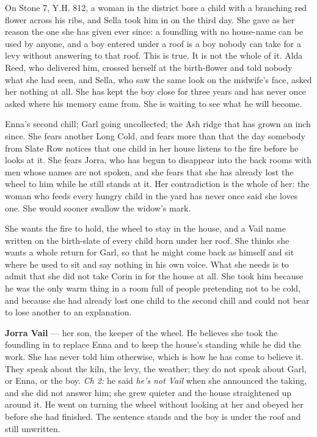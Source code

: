 \documentclass{design/chronicle}
\begin{document}
{On Stone 7, Y.H. 812, a woman in the district bore a child with a branching red flower across his ribs, and Sella took him in on the third day. She gave as her reason the one she has given ever since: a foundling with no house-name can be used by anyone, and a boy entered under a roof is a boy nobody can take for a levy without answering to that roof. This is true. It is not the whole of it. Alda Reed, who delivered him, crossed herself at the birth-flower and told nobody what she had seen, and Sella, who saw the same look on the midwife’s face, asked her nothing at all. She has kept the boy close for three years and has never once asked where his memory came from. She is waiting to see what he will become.

Enna’s second chill; Garl going uncollected; the Ash ridge that has grown an inch since. She fears another Long Cold, and fears more than that the day somebody from Slate Row notices that one child in her house listens to the fire before he looks at it. She fears Jorra, who has begun to disappear into the back rooms with men whose names are not spoken, and she fears that she has already lost the wheel to him while he still stands at it. Her contradiction is the whole of her: the woman who feeds every hungry child in the yard has never once said she loves one. She would sooner swallow the widow’s mark.

She wants the fire to hold, the wheel to stay in the house, and a Vail name written on the birth-slate of every child born under her roof. She thinks she wants a whole return for Garl, so that he might come back as himself and sit where he used to sit and say nothing in his own voice. What she needs is to admit that she did not take Corin in for the house at all. She took him because he was the only warm thing in a room full of people pretending not to be cold, and because she had already lost one child to the second chill and could not bear to lose another to an explanation.

\textbf{Jorra Vail} — her son, the keeper of the wheel. He believes she took the foundling in to replace Enna and to keep the house’s standing while he did the work. She has never told him otherwise, which is how he has come to believe it. They speak about the kiln, the levy, the weather; they do not speak about Garl, or Enna, or the boy. \emph{Ch 2:} he said \emph{he’s not Vail} when she announced the taking, and she did not answer him; she grew quieter and the house straightened up around it. He went on turning the wheel without looking at her and obeyed her before she had finished. The sentence stands and the boy is under the roof and still unwritten.

}
\end{document}

